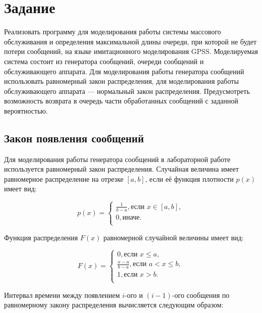 \chapter{Задание}

Реализовать программу для моделирования работы системы массового обслуживания и определения максимальной длины очереди, при которой не будет потери сообщений, на языке имитационного моделирования GPSS. Моделируемая система состоит из генератора сообщений, очереди сообщений и обслуживающего аппарата. Для моделирования работы генератора сообщений использовать равномерный закон распределения, для моделирования работы обслуживающего аппарата --- нормальный закон распределения. Предусмотреть возможность возврата в очередь части обработанных сообщений с заданной вероятностью.

\section{Закон появления сообщений}

Для моделирования работы генератора сообщений в лабораторной работе используется равномерный закон распределения. Случайная величина имеет равномерное распределение на отрезке $[a, b]$, если её функция плотности $p(x)$ имеет вид:

\begin{equation}
    p(x) = 
    \begin{cases}
        \frac{1}{b - a}, \text{если } x \in [a, b],\\
        0, \text{иначе.} \\
    \end{cases}
\end{equation}

Функция распределения $F(x)$ равномерной случайной величины имеет вид:

\begin{equation}
    F(x) = 
    \begin{cases}
    		0, \text{если } x \leqslant a, \\
        \frac{x - a}{b - a}, \text{если } a < x \leqslant b,\\
        1, \text{если } x > b. \\
    \end{cases}
\end{equation}

Интервал времени между появлением $i$-ого и $(i - 1)$-ого сообщения по равномерному закону распределения вычисляется следующим образом:

